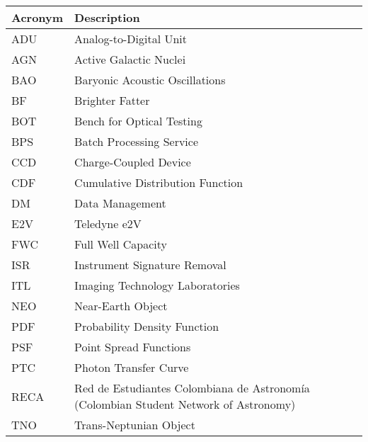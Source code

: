 \addtocounter{table}{-1}
\begin{longtable}{p{}p{}}\hline
\textbf{Acronym} & \textbf{Description}  \\\hline
ADU & Analog-to-Digital Unit    \\
AGN & Active Galactic Nuclei    \\
BAO & Baryonic Acoustic Oscillations    \\
BF & Brighter Fatter    \\
BOT & Bench for Optical Testing    \\
BPS & Batch Processing Service    \\
CCD & Charge-Coupled Device    \\
CDF & Cumulative Distribution Function    \\
DM & Data Management    \\
E2V & Teledyne e2V    \\
FWC & Full Well Capacity    \\
ISR & Instrument Signature Removal    \\
ITL & Imaging Technology Laboratories    \\
NEO & Near-Earth Object    \\
PDF & Probability Density Function    \\
PSF & Point Spread Functions    \\
PTC & Photon Transfer Curve    \\
RECA & Red de Estudiantes Colombiana de Astronomía (Colombian Student Network of Astronomy)\\
TNO & Trans-Neptunian Object    \\
\hline
\end{longtable}
